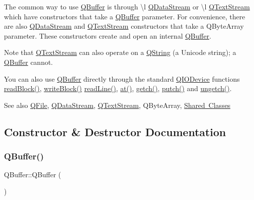 The common way to use \mbox{\hyperlink{class_q_buffer}{Q\+Buffer}} is through \textbackslash{}l \mbox{\hyperlink{class_q_data_stream}{Q\+Data\+Stream}} or \textbackslash{}l \mbox{\hyperlink{class_q_text_stream}{Q\+Text\+Stream}} which have constructors that take a \mbox{\hyperlink{class_q_buffer}{Q\+Buffer}} parameter. For convenience, there are also \mbox{\hyperlink{class_q_data_stream}{Q\+Data\+Stream}} and \mbox{\hyperlink{class_q_text_stream}{Q\+Text\+Stream}} constructors that take a Q\+Byte\+Array parameter. These constructors create and open an internal \mbox{\hyperlink{class_q_buffer}{Q\+Buffer}}.

Note that \mbox{\hyperlink{class_q_text_stream}{Q\+Text\+Stream}} can also operate on a \mbox{\hyperlink{class_q_string}{Q\+String}} (a Unicode string); a \mbox{\hyperlink{class_q_buffer}{Q\+Buffer}} cannot.

You can also use \mbox{\hyperlink{class_q_buffer}{Q\+Buffer}} directly through the standard \mbox{\hyperlink{class_q_i_o_device}{Q\+I\+O\+Device}} functions \mbox{\hyperlink{class_q_buffer_a7deacf4bbd599f075f3dad4b20cafeb0}{read\+Block()}}, \mbox{\hyperlink{class_q_buffer_ad8bdac07e525a782d0759d3082bb296a}{write\+Block()}} \mbox{\hyperlink{class_q_buffer_adcbf115b0d36683e6da2d3baa367382d}{read\+Line()}}, \mbox{\hyperlink{class_q_buffer_adbff1cb0375ac6bc27621d26450c6c0a}{at()}}, \mbox{\hyperlink{class_q_buffer_abec634737e1d5a9b314e822737e51992}{getch()}}, \mbox{\hyperlink{class_q_buffer_aa05ca49f73284ac1fa2b01ffb3be2874}{putch()}} and \mbox{\hyperlink{class_q_buffer_a52f9ebc674d0651e6fd89e148529bb50}{ungetch()}}.

\begin{DoxySeeAlso}{See also}
\mbox{\hyperlink{class_q_file}{Q\+File}}, \mbox{\hyperlink{class_q_data_stream}{Q\+Data\+Stream}}, \mbox{\hyperlink{class_q_text_stream}{Q\+Text\+Stream}}, Q\+Byte\+Array, \mbox{\hyperlink{}{Shared Classes}} 
\end{DoxySeeAlso}


\subsection{Constructor \& Destructor Documentation}
\mbox{\label{class_q_buffer_a89e6eb0af3076429fcaf14755f856d9a}} 
\subsubsection{\texorpdfstring{QBuffer()}{QBuffer()}\hspace{0.1cm}{\footnotesize\ttfamily [1/2]}}
{\footnotesize\ttfamily Q\+Buffer\+::\+Q\+Buffer (\begin{DoxyParamCaption}{ }\end{DoxyParamCaption})}


